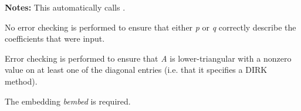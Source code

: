 \documentclass[letterpaper,10pt,english]{sphinxmanual}
\begin{document}
\begin{fulllineitems}
\begin{description}
\begin{itemize}
\end{itemize}

\end{description}

\textbf{Notes:} This automatically calls {\hyperref[c_interface/User_callable:ARKodeSetImplicit]{}}.

No error checking is performed to ensure that either \emph{p} or \emph{q}
correctly describe the coefficients that were input.

Error checking is performed to ensure that \emph{A} is
lower-triangular with a nonzero value on at least one of the
diagonal entries (i.e. that it specifies a DIRK method).

The embedding \emph{bembed} is required.

\end{fulllineitems}

\end{document}

